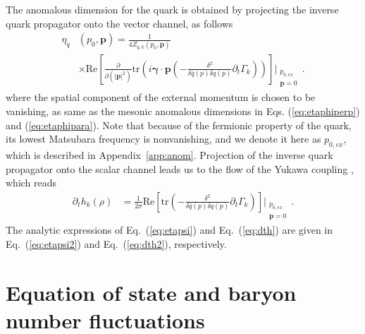 \documentclass[%
reprint,
superscriptaddress,
showpacs,preprintnumbers,
 amsmath,amssymb,
 aps,
prd,
]{revtex4-1}
\def\Eq#1{Eq.~(\ref{#1})}
\def\app#1{Appendix~\ref{#1}}
\begin{document}
The anomalous dimension for the quark is obtained by projecting the inverse quark propagator onto the vector channel, as follows
\begin{align}
  \eta_{q}&(p_0,\bm{p})=\frac{1}{4 Z_{q,k}(p_0,\bm{p})}\nonumber \\[2ex]
          &\times\mathrm{Re}\left[\frac{\partial}{\partial (|\bm{p}|^2)}\mathrm{tr}
            \left(i \bm{\gamma}\cdot\bm{p}\left(-\frac{\delta^2}{\delta\bar{q}(p)
            \delta q(p)}\partial_t \Gamma_k\right)\right)\right]\Bigg|_{\substack{p_{0,ex}\\ \bm{p}=0}}\,.   \label{eq:etapsi}
\end{align}
where the spatial component of the external momentum is chosen to be vanishing, as same as the mesonic anomalous dimensions in Eqs. (\ref{eq:etaphiperp}) and (\ref{eq:etaphipara}). Note that because of the fermionic property of the quark, its lowest Matsubara frequency is nonvanishing, and we denote it here as $p_{0,ex}$, which is described in \app{app:anom}.  Projection of the inverse quark propagator onto the scalar channel leads us to the flow of the Yukawa coupling \cite{Pawlowski:2014zaa}, which reads
\begin{align}
  \partial_t h_k(\rho)&=\frac{1}{2 \sigma}\mathrm{Re}\left[\mathrm{tr}\left(-\frac{\delta^2}{\delta\bar{q}(p)
            \delta q(p)}\partial_t \Gamma_k\right)\right]\Bigg|_{\substack{p_{0,ex}\\ \bm{p}=0}}\,.  \label{eq:dth}
\end{align}
The analytic expressions of \Eq{eq:etapsi} and \Eq{eq:dth} are given in \Eq{eq:etapsi2} and \Eq{eq:dth2}, respectively.



\section{Equation of state and baryon number fluctuations}
\label{sec:EoS}
\end{document}
